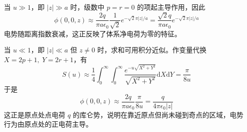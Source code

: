 \documentclass[11pt,a4paper]{ctexart}
\newcommand{\dd}{\mathrm{d}}
\begin{document}
当 $u\gg 1$，即 $\left|z\right|\gg a$ 时，级数中 $p=r=0$ 的项起主导作用，因此
\[
\phi(0,0,z)\approx \frac{2q}{\pi a\epsilon_0}\frac{1}{\sqrt{2}}e^{-\sqrt{2}\pi\left|z\right|/a}
=\frac{\sqrt{2}q}{\pi a\epsilon_0}e^{-\sqrt{2}\pi\left|z\right|/a}
\]
电势随距离指数衰减，这正反映了体系净电荷为零的特征。

当 $u\ll 1$，即 $\left|z\right|\ll a$ 但 $z\neq 0$ 时，求和可用积分近似。作变量代换 $X=2p+1,\;Y=2r+1$，有
\[
S(u)\approx \frac{1}{4}\int_0^\infty\int_0^\infty\frac{e^{-u\sqrt{X^2+Y^2}}}{\sqrt{X^2+Y^2}}\dd X\dd Y
=\frac{\pi}{8u}
\]
于是
\[
\phi(0,0,z)\approx \frac{2q}{\pi a\epsilon_0}\frac{\pi}{8u}
=\frac{q}{4\pi\epsilon_0\left|z\right|}
\]
这正是原点处点电荷 $q$ 的库仑势，说明在靠近原点但尚未碰到奇点的区域，电势行为由原点处的正电荷主导。
\end{document}
